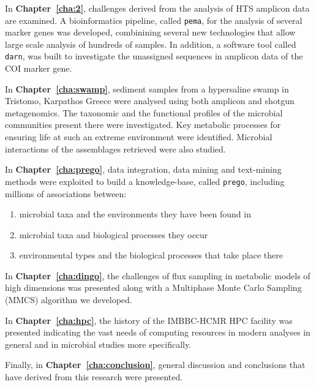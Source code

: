    In \textbf{Chapter~\ref{cha:2}}, challenges derived from the analysis of HTS amplicon data are examined.
   A bioinformatics pipeline, called \texttt{pema}, for the analysis of several marker genes was developed, combinining several new technologies that allow large scale analysis of hundreds of samples. 
   In addition, a software tool called \texttt{darn}, was built to investigate the unassigned sequences in amplicon data of the COI marker gene. 

   In \textbf{Chapter~\ref{cha:swamp}}, sediment samples from a hypersaline swamp in Tristomo, Karpathos Greece were analysed using both amplicon and shotgun metagenomics. 
   The taxonomic and the functional profiles of the microbial communities present there were investigated. 
   Key metabolic processes for ensuring life at such an extreme environment were identified.
   Microbial interactions of the assemblages retrieved were also studied. 

   In \textbf{Chapter~\ref{cha:prego}}, data integration, data mining and text-mining methods were exploited to build a knowledge-base, called \texttt{prego}, including millions of associations between:
   \begin{enumerate}
      \item microbial taxa and the environments they have been found in 
      \item microbial taxa and biological processes they occur
      \item environmental types and the biological processes that take place there
   \end{enumerate}

   In \textbf{Chapter~\ref{cha:dingo}}, the challenges of flux sampling in metabolic models of high dimensions was presented along with a Multiphase Monte Carlo Sampling (MMCS) algorithm we developed. 

   In \textbf{Chapter~\ref{cha:hpc}}, the history of the IMBBC-HCMR HPC facility was presented indicating the vast needs of computing resources in modern analyses in general and in microbial studies more specifically. 


   Finally, in \textbf{Chapter~\ref{cha:conclusion}}, general discussion and conclusions that have derived from this research were presented. 





